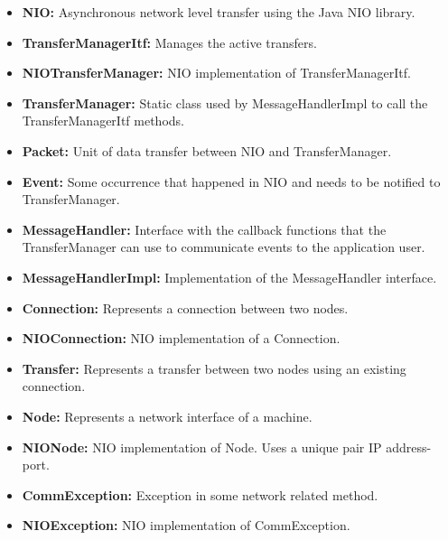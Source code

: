 \documentclass[11pt]{article}
\begin{document}
	\begin{itemize}
		\item \textbf{NIO:}
			Asynchronous network level transfer using the Java NIO library.
		\item \textbf{TransferManagerItf:}
			Manages the active transfers.
		\item \textbf{NIOTransferManager:}
			NIO implementation of TransferManagerItf.
		\item \textbf{TransferManager:}
			Static class used by MessageHandlerImpl to call the TransferManagerItf methods.
		\item \textbf{Packet:}
			Unit of data transfer between NIO and TransferManager.
		\item \textbf{Event:}
			Some occurrence that happened in NIO and needs to be notified to TransferManager.
		\item \textbf{MessageHandler:}
			Interface with the callback functions that the TransferManager can use to communicate events to the application user.
		\item \textbf{MessageHandlerImpl:}
			Implementation of the MessageHandler interface.
		\item \textbf{Connection:}
			Represents a connection between two nodes.
		\item \textbf{NIOConnection:}
			NIO implementation of a Connection.
		\item \textbf{Transfer:}
			Represents a transfer between two nodes using an existing connection.
		\item \textbf{Node:}
			Represents a network interface of a machine.
		\item \textbf{NIONode:}
			NIO implementation of Node. Uses a unique pair IP address-port.
		\item \textbf{CommException:}
			Exception in some network related method.
		\item \textbf{NIOException:}
			NIO implementation of CommException.
		\end{itemize}
\end{document}
